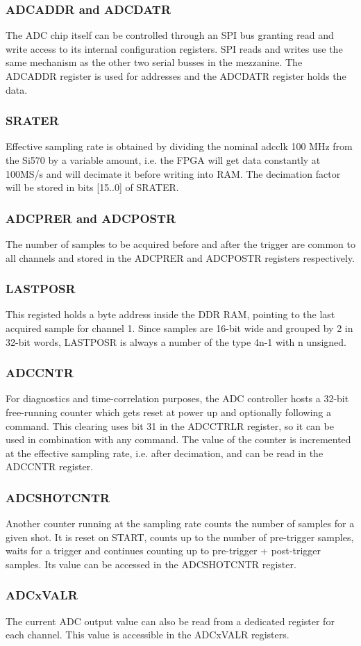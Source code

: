 \documentclass{article}
\begin{document}
\subsubsection{ADCADDR and ADCDATR}
The ADC chip itself can be controlled through an SPI bus granting read and write access to its internal configuration registers. SPI reads and writes use the same mechanism as the other two serial busses in the mezzanine. The ADCADDR register is used for addresses and the ADCDATR register holds the data.

\subsubsection{SRATER}
Effective sampling rate is obtained by dividing the nominal adcclk 100 MHz from the Si570 by a variable amount, i.e. the FPGA will get data constantly at 100MS/s and will decimate it before writing into RAM. The decimation factor will be stored in bits [15..0] of SRATER.

\subsubsection{ADCPRER and ADCPOSTR}
The number of samples to be acquired before and after the trigger are common to all channels and stored in the ADCPRER and ADCPOSTR registers respectively.

\subsubsection{LASTPOSR}
This registed holds a byte address inside the DDR RAM, pointing to the last acquired sample for channel 1. Since samples are 16-bit wide and grouped by 2 in 32-bit words, LASTPOSR is always a number of the type 4n-1 with n unsigned.

\subsubsection{ADCCNTR}
\label{sssec:adccntr}
For diagnostics and time-correlation purposes, the ADC controller hosts a 32-bit free-running counter which gets reset at power up and optionally following a command. This clearing uses bit 31 in the ADCCTRLR register, so it can be used in combination with any command. The value of the counter is incremented at the effective sampling rate, i.e. after decimation, and can be read in the ADCCNTR register.   

\subsubsection{ADCSHOTCNTR}
Another counter running at the sampling rate counts the number of samples for a given shot. It is reset on START, counts up to the number of pre-trigger samples, waits for a trigger and continues counting up to pre-trigger + post-trigger samples. Its value can be accessed in the ADCSHOTCNTR register.

\subsubsection{ADCxVALR}
The current ADC output value can also be read from a dedicated register for each channel. This value is accessible in the ADCxVALR registers.
\end{document}
